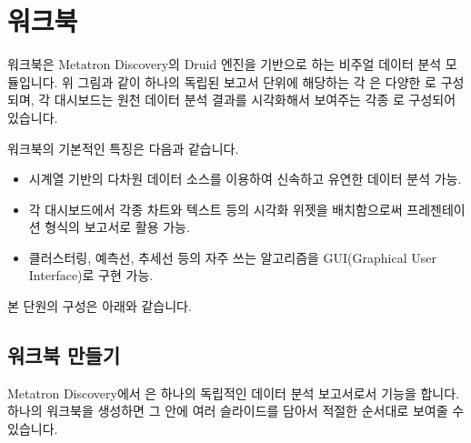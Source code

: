 \documentclass[letterpaper,10pt,english]{sphinxmanual}
\begin{document}
\chapter{워크북}
\label{\detokenize{discovery/part04/index:id1}}\label{\detokenize{discovery/part04/index::doc}}
\begin{figure}[H]
\centering

\noindent{}
\end{figure}

워크북은 Metatron Discovery의 Druid 엔진을 기반으로 하는 비주얼 데이터 분석 모듈입니다.
위 그림과 같이 하나의 독립된 보고서 단위에 해당하는 각 은 다양한 로 구성되며, 각 대시보드는 원천 데이터 분석 결과를 시각화해서 보여주는 각종 로 구성되어 있습니다.

워크북의 기본적인 특징은 다음과 같습니다.
\begin{itemize}
\item {} 
시계열 기반의 다차원 데이터 소스를 이용하여 신속하고 유연한 데이터 분석 가능.

\item {} 
각 대시보드에서 각종 차트와 텍스트 등의 시각화 위젯을 배치함으로써 프레젠테이션 형식의 보고서로 활용 가능.

\item {} 
클러스터링, 예측선, 추세선 등의 자주 쓰는 알고리즘을 GUI(Graphical User Interface)로 구현 가능.

\end{itemize}

본 단원의 구성은 아래와 같습니다.


\section{워크북 만들기}
\label{\detokenize{discovery/part04/create_a_workbook:id1}}\label{\detokenize{discovery/part04/create_a_workbook::doc}}
Metatron Discovery에서 은 하나의 독립적인 데이터 분석 보고서로서 기능을 합니다. 하나의 워크북을 생성하면 그 안에 여러  슬라이드를 담아서 적절한 순서대로 보여줄 수 있습니다.
\end{document}

